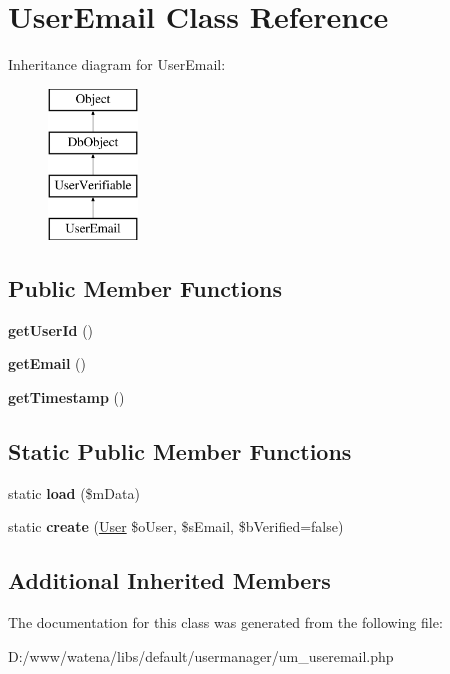 \hypertarget{class_user_email}{\section{User\-Email Class Reference}
\label{class_user_email}
}
Inheritance diagram for User\-Email\-:\begin{figure}[H]
\begin{center}
\leavevmode
\includegraphics[height=4.000000cm]{class_user_email}
\end{center}
\end{figure}
\subsection*{Public Member Functions}
\begin{DoxyCompactItemize}
\item 
\hypertarget{class_user_email_ac9b1e7edcdcd48eec9ccb2fb5711a577}{{\bfseries get\-User\-Id} ()}\label{class_user_email_ac9b1e7edcdcd48eec9ccb2fb5711a577}

\item 
\hypertarget{class_user_email_acaec211e03fa414944e36d83edbea08d}{{\bfseries get\-Email} ()}\label{class_user_email_acaec211e03fa414944e36d83edbea08d}

\item 
\hypertarget{class_user_email_a3754c0ac5273044d0d69daca9d7e647e}{{\bfseries get\-Timestamp} ()}\label{class_user_email_a3754c0ac5273044d0d69daca9d7e647e}

\end{DoxyCompactItemize}
\subsection*{Static Public Member Functions}
\begin{DoxyCompactItemize}
\item 
\hypertarget{class_user_email_ae9ed368c735f6dd793d0fa039e7986c8}{static {\bfseries load} (\$m\-Data)}\label{class_user_email_ae9ed368c735f6dd793d0fa039e7986c8}

\item 
\hypertarget{class_user_email_a4f7a60f9a7301d4cb023091c7dd48268}{static {\bfseries create} (\hyperlink{class_user}{User} \$o\-User, \$s\-Email, \$b\-Verified=false)}\label{class_user_email_a4f7a60f9a7301d4cb023091c7dd48268}

\end{DoxyCompactItemize}
\subsection*{Additional Inherited Members}


The documentation for this class was generated from the following file\-:\begin{DoxyCompactItemize}
\item 
D\-:/www/watena/libs/default/usermanager/um\-\_\-useremail.\-php\end{DoxyCompactItemize}
